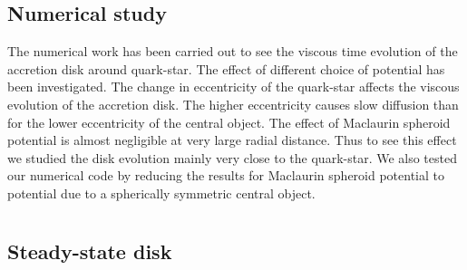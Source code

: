 \documentclass[useAMS,usenatbib]{mn2e}
\begin{document}
\subsection{Numerical study}
The numerical work has been carried out to see the viscous time evolution of the accretion disk around quark-star. The effect of different choice of potential has been investigated. The change in eccentricity of the quark-star affects the viscous evolution of the accretion disk. The higher eccentricity causes slow diffusion than for the lower eccentricity of the central object. The effect of Maclaurin spheroid potential is almost negligible at very large radial distance. Thus to see this effect we studied the disk evolution mainly very close to the quark-star. We also tested our numerical code by reducing the results for Maclaurin spheroid potential to potential due to a spherically symmetric central object.
\appendix
\section{}
\subsection{Steady-state disk}
\label{a1}
\end{document}

